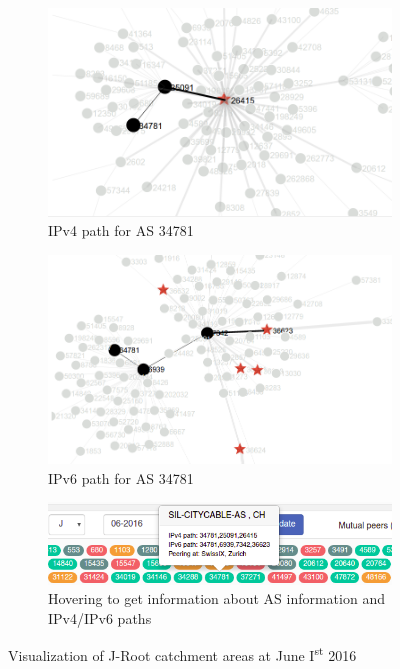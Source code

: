 \begin{figure}[!ht]
	\begin{subfigure}{.5\textwidth}
		\centering
		\includegraphics[width=1\linewidth]{img/j-root-as34781-IPv4}
		\caption{IPv4 path for AS 34781}
		\label{fig:ch04:j-root-as34781-4}
	\end{subfigure}	
	\begin{subfigure}{.5\textwidth}
		\centering
		\includegraphics[width=1\linewidth]{img/j-root-as34781-IPv6}
		\caption{IPv6 path for AS 34781}
		\label{fig:ch04:j-root-as34781-6}
	\end{subfigure}	
	\begin{subfigure}{1\textwidth}
		\centering
		\includegraphics[width=0.8\linewidth]{img/j-root-hover}
		\caption{Hovering to get information about AS information and IPv4/IPv6 paths}
		\label{fig:ch04:j-root-hover}
	\end{subfigure}		
	\caption{Visualization of J-Root catchment areas at June I\textsuperscript{st} 2016}
	\label{fig:ch04:vis}
\end{figure}

